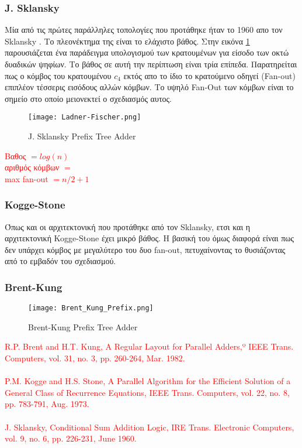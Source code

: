 \subsubsection{J. Sklansky}
Μία από τις πρώτες παράλληλες τοπολογίες που προτάθηκε ήταν το 1960 απο τον Sklansky \cite{5219822}. Το πλεονέκτημα της είναι το ελάχιστο βάθος. Στην εικόνα \ref{Ladner-FischerTree} παρουσιάζεται ένα παράδειγμα υπολογισμού των κρατουμένων για είσοδο των οκτώ δυαδικών ψηφίων. Το βάθος σε αυτή την περίπτωση είναι τρία επίπεδα. Παρατηρείται πως ο κόμβος του κρατουμένου $c_4$ εκτός απο το ίδιο το κρατούμενο οδηγεί (Fan-out) επιπλέον τέσσερις εισόδους αλλών κόμβων. Το υψηλό Fan-Out των κόμβων είναι το σημείο στο οποίο μειονεκτεί ο σχεδιασμός αυτος.
\begin{figure}[H]
    \centering
    \texttt{[image: Ladner-Fischer.png]}
    \caption{J. Sklansky Prefix Tree Adder}
    \label{Ladner-FischerTree}
\end{figure}
\textcolor{red}{
Βαθος $= log(n)$\\
αριθμός κόμβων $ = $\\
max fan-out $ = n/2 + 1$
}

\subsubsection{Kogge-Stone}
Όπως και οι αρχιτεκτονική που προτάθηκε από τον Sklansky, ετσι και η αρχιτεκτονική
Kogge-Stone \cite{} έχει μικρό βάθος. Η βασική του όμως διαφορά είναι πως δεν υπάρχει 
κόμβος με μεγαλύτερο του δυο fan-out, πετυχαίνοντας το θυσιάζοντας από το 
εμβαδόν του σχεδιασμού.


\subsubsection{Brent-Kung}
\begin{figure}[H]
    \centering
    \texttt{[image: Brent\_Kung\_Prefix.png]}
    \caption{Brent-Kung Prefix Tree Adder}
    \label{BrentKungTree}
\end{figure}




\textcolor{red}{
R.P. Brent and H.T. Kung, A Regular Layout for Parallel
Adders,º IEEE Trans. Computers, vol. 31, no. 3, pp. 260-264, Mar.
1982.
\\\\
P.M. Kogge and H.S. Stone, A Parallel Algorithm for the Efficient
Solution of a General Class of Recurrence Equations, IEEE Trans.
Computers, vol. 22, no. 8, pp. 783-791, Aug. 1973.
\\\\
J. Sklansky, Conditional Sum Addition Logic, IRE Trans.
Electronic Computers, vol. 9, no. 6, pp. 226-231, June 1960.
}


